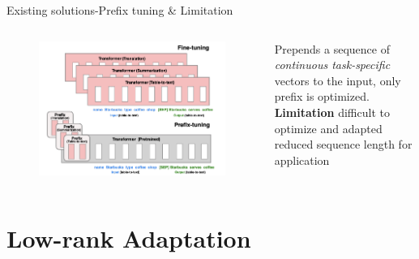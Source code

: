 \documentclass[aspectratio=169,xcolor=dvipsnames]{beamer}
\begin{document}
\begin{frame}{Existing solutions-Prefix tuning \& Limitation}
    \begin{columns}
        \begin{column}{0.7\textwidth}
            \begin{figure}
                \centering
                \includegraphics[width=0.9\linewidth]{figures/prefix_tuning_architecture.png}
            \end{figure}
        \end{column}
        \begin{column}{0.3\textwidth}
           Prepends a sequence of \textit{continuous task-specific} vectors to the input, only prefix is optimized. \\
           \bigskip
           \textbf{Limitation} difficult to optimize and adapted reduced sequence length for application
        \end{column}
    \end{columns}
\end{frame}




\section{Low-rank Adaptation}
\end{document}
